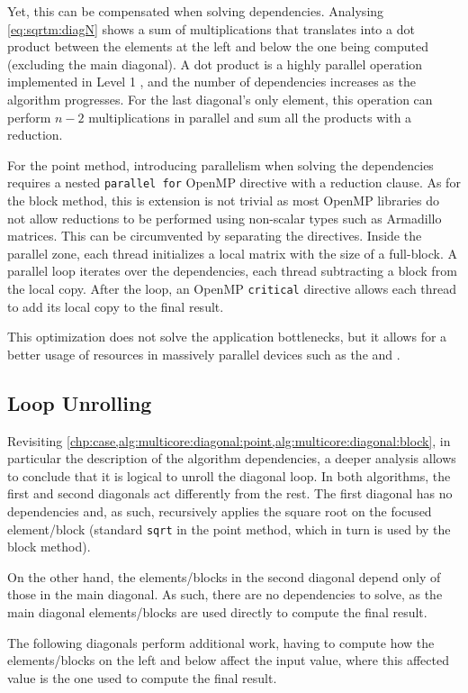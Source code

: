 \documentclass[../thesis]{subfiles}
\begin{document}
	Yet, this can be compensated when solving dependencies. Analysing \cref{eq:sqrtm:diagN} shows a sum of multiplications that translates into a dot product between the elements at the left and below the one being computed (excluding the main diagonal). A dot product is a highly parallel operation implemented in Level 1 \blas, and the number of dependencies increases as the algorithm progresses. For the last diagonal's only element, this operation can perform $n-2$ multiplications in parallel and sum all the products with a reduction.

	For the point method, introducing parallelism when solving the dependencies requires a nested \texttt{parallel for} OpenMP directive with a reduction clause. As for the block method, this is extension is not trivial as most OpenMP libraries do not allow reductions to be performed using non-scalar types such as Armadillo matrices. This can be circumvented by separating the directives. Inside the parallel zone, each thread initializes a local matrix with the size of a full-block. A parallel loop iterates over the dependencies, each thread subtracting a block from the local copy. After the loop, an OpenMP \texttt{critical} directive allows each thread to add its local copy to the final result.

	This optimization does not solve the application bottlenecks, but it allows for a better usage of resources in massively parallel devices such as the \intel\xeonphi and \gpus.

	\subsection{Loop Unrolling}
	Revisiting \cref{chp:case,alg:multicore:diagonal:point,alg:multicore:diagonal:block}, in particular the description of the algorithm dependencies, a deeper analysis allows to conclude that it is logical to unroll the diagonal loop. In both algorithms, the first and second diagonals act differently from the rest. The first diagonal has no dependencies and, as such, recursively applies the square root on the focused element/block (standard \texttt{sqrt} in the point method, which in turn is used by the block method).

	On the other hand, the elements/blocks in the second diagonal depend only of those in the main diagonal. As such, there are no dependencies to solve, as the main diagonal elements/blocks are used directly to compute the final result.

	The following diagonals perform additional work, having to compute how the elements/blocks on the left and below affect the input value, where this affected value is the one used to compute the final result.
\end{document}
